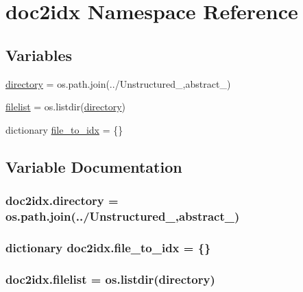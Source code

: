 \hypertarget{namespacedoc2idx}{}\section{doc2idx Namespace Reference}
\label{namespacedoc2idx}
\subsection*{Variables}
\begin{DoxyCompactItemize}
\item 
\hyperlink{namespacedoc2idx_ab2f2f2e40a59973b3b54e40a655c52f7}{directory} = os.\+path.\+join(\textquotesingle{}../Unstructured\+\_\+\textquotesingle{},\textquotesingle{}abstract\+\_\+\textquotesingle{})
\item 
\hyperlink{namespacedoc2idx_ab90b33eac8ae95decf3764543e3bcfb5}{filelist} = os.\+listdir(\hyperlink{namespacedoc2idx_ab2f2f2e40a59973b3b54e40a655c52f7}{directory})
\item 
dictionary \hyperlink{namespacedoc2idx_ab6666240521d80878db335ed60ea3ac6}{file\+\_\+to\+\_\+idx} = \{\}
\end{DoxyCompactItemize}


\subsection{Variable Documentation}
\subsubsection[{\texorpdfstring{directory}{directory}}]{\setlength{\rightskip}{0pt plus 5cm}doc2idx.\+directory = os.\+path.\+join(\textquotesingle{}../Unstructured\+\_\+\textquotesingle{},\textquotesingle{}abstract\+\_\+\textquotesingle{})}\hypertarget{namespacedoc2idx_ab2f2f2e40a59973b3b54e40a655c52f7}{}\label{namespacedoc2idx_ab2f2f2e40a59973b3b54e40a655c52f7}
\subsubsection[{\texorpdfstring{file\+\_\+to\+\_\+idx}{file_to_idx}}]{\setlength{\rightskip}{0pt plus 5cm}dictionary doc2idx.\+file\+\_\+to\+\_\+idx = \{\}}\hypertarget{namespacedoc2idx_ab6666240521d80878db335ed60ea3ac6}{}\label{namespacedoc2idx_ab6666240521d80878db335ed60ea3ac6}
\subsubsection[{\texorpdfstring{filelist}{filelist}}]{\setlength{\rightskip}{0pt plus 5cm}doc2idx.\+filelist = os.\+listdir({\bf directory})}\hypertarget{namespacedoc2idx_ab90b33eac8ae95decf3764543e3bcfb5}{}\label{namespacedoc2idx_ab90b33eac8ae95decf3764543e3bcfb5}
